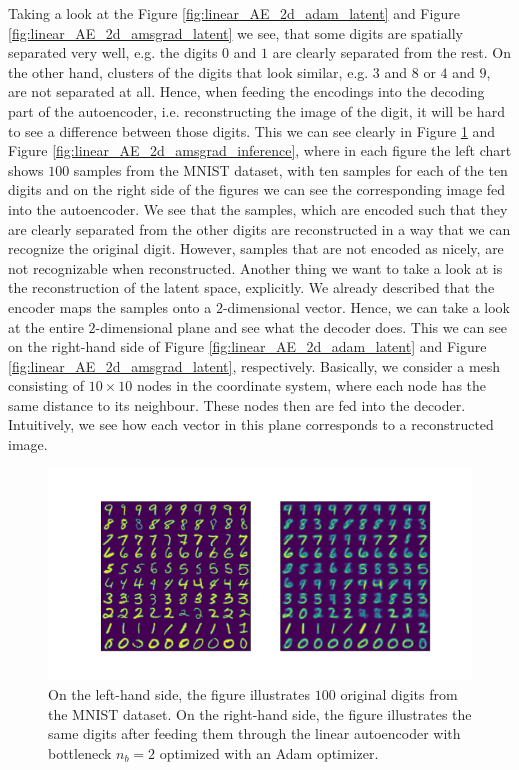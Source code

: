 Taking a look at the Figure \ref{fig:linear_AE_2d_adam_latent} and Figure \ref{fig:linear_AE_2d_amsgrad_latent} we see, that some digits are spatially separated very well, e.g. the digits $0$ and $1$ are clearly separated from the rest. On the other hand, clusters of the digits that look similar, e.g. $3$ and $8$ or $4$ and $9$, are not separated at all. Hence, when feeding the encodings into the decoding part of the autoencoder, i.e. reconstructing the image of the digit, it will be hard to see a difference between those digits. This we can see clearly in Figure \ref{fig:linear_AE_2d_adam_inference} and Figure \ref{fig:linear_AE_2d_amsgrad_inference}, where in each figure the left chart shows $100$ samples from the MNIST dataset, with ten samples for each of the ten digits and on the right side of the figures we can see the corresponding image fed into the autoencoder. We see that the samples, which are encoded such that they are clearly separated from the other digits are reconstructed in a way that we can recognize the original digit. However, samples that are not encoded as nicely, are not recognizable when reconstructed. Another thing we want to take a look at is the reconstruction of the latent space, explicitly. We already described that the encoder maps the samples onto a $2$-dimensional vector. Hence, we can take a look at the entire $2$-dimensional plane and see what the decoder does. This we can see on the right-hand side of Figure \ref{fig:linear_AE_2d_adam_latent} and Figure \ref{fig:linear_AE_2d_amsgrad_latent}, respectively. Basically, we consider a mesh consisting of $10\times 10$ nodes in the coordinate system, where each node has the same distance to its neighbour. These nodes then are fed into the decoder. Intuitively, we see how each vector in this plane corresponds to a reconstructed image.


\begin{figure}
\begin{center}
   \begin{minipage}[b]{\linewidth}
      \includegraphics[trim = 15mm 10mm 15mm 15mm, clip, width=\linewidth]{linear_AE_2d_adam_inference}
	\end{minipage}
\end{center}
\caption{On the left-hand side, the figure illustrates $100$ original digits from the MNIST dataset. On the right-hand side, the figure illustrates the same digits after feeding them through the linear autoencoder with bottleneck $n_b=2$ optimized with an Adam optimizer.}\label{fig:linear_AE_2d_adam_inference}
\end{figure}


